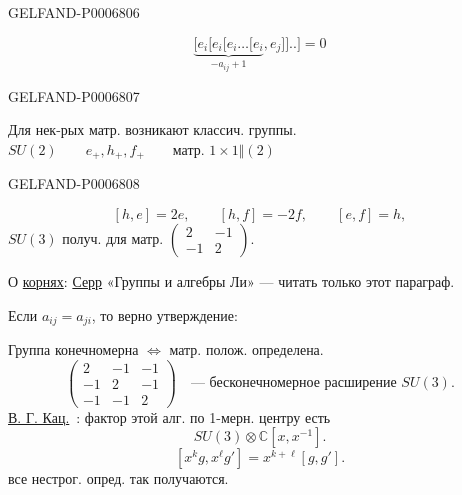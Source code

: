 \begin{GelfandAdjacentEvidence}{GELFAND-P000680}{6}

\[
\underbrace{[e_i[e_i[e_i\ldots[e_i}_{-a_{ij}+1},e_j]]\mathord{..}]=0
\]
\end{GelfandAdjacentEvidence}
\begin{GelfandAdjacentEvidence}{GELFAND-P000680}{7}


Для нек-рых матр. возникают классич. группы.
\(SU(2)\qquad e_+,h_+,f_+\qquad\text{матр. }1\times1\Vert(2)\)
\end{GelfandAdjacentEvidence}
\begin{GelfandAdjacentEvidence}{GELFAND-P000680}{8}

\[
[h,e]=2e,\qquad[h,f]=-2f,\qquad[e,f]=h,
\]
\(SU(3)\) получ. для матр. \(\begin{pmatrix}2&-1\\-1&2\end{pmatrix}\).

О \underline{корнях}: \underline{Серр} «Группы и алгебры Ли» ---
читать только этот параграф.

Если \(a_{ij}=a_{ji}\), то верно утверждение:

Группа конечномерна \(\Leftrightarrow\) матр. полож. определена.
\[
\begin{pmatrix}
2&-1&-1\\
-1&2&-1\\
-1&-1&2
\end{pmatrix}
\quad\text{--- бесконечномерное расширение }SU(3).
\]
\underline{В. Г. Кац.}\ : фактор этой алг. по 1-мерн. центру есть
\[
SU(3)\otimes\mathbb C[x,x^{-1}].
\]
\[
[x^kg,x^\ell g']=x^{k+\ell}[g,g'].
\]
все нестрог. опред. так получаются.
\end{GelfandAdjacentEvidence}




